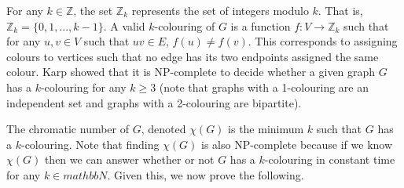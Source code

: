\documentclass[letterpaper,12pt,titlepage,oneside,final]{article}
\begin{document}
For any $k \in \mathbb{Z}$, the set $\mathbb{Z}_{k}$ represents the set of integers modulo $k$. That is, $\mathbb{Z}_{k} = \{0, 1, ..., k - 1\}$. A valid $k$-colouring of $G$ is a function $f: V \rightarrow \mathbb{Z}_{k}$ such that for any $u, v \in V$ such that $uv \in E$, $f(u) \neq f(v)$. This corresponds to assigning colours to vertices such that no edge has its two endpoints assigned the same colour. Karp \cite{karp1972reducibility} showed that it is NP-complete to decide whether a given graph $G$ has a $k$-colouring for any $k \geq 3$ (note that graphs with a 1-colouring are an independent set and graphs with a 2-colouring are bipartite).

The chromatic number of $G$, denoted $\chi(G)$ is the minimum $k$ such that $G$ has a $k$-colouring. Note that finding $\chi(G)$ is also NP-complete because if we know $\chi(G)$ then we can answer whether or not $G$ has a $k$-colouring in constant time for any $k \in mathbb{N}$. Given this, we now prove the following.
\end{document}
